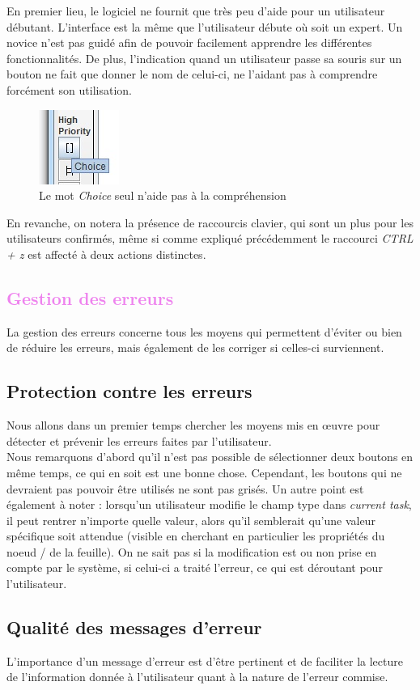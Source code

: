 \documentclass[12pt, a4paper]{article}
\begin{document}
En premier lieu, le logiciel ne fournit que très peu d'aide pour un utilisateur débutant. L'interface est la même que l'utilisateur débute où soit un expert. Un novice n'est pas guidé afin de pouvoir facilement apprendre les différentes fonctionnalités. De plus, l'indication quand un utilisateur passe sa souris sur un bouton ne fait que donner le nom de celui-ci, ne l'aidant pas à comprendre forcément son utilisation.
\begin{figure}[h]
\begin{center}
   \includegraphics[scale = 1]{imagebtn.jpg}
	\caption{Le mot \emph{Choice} seul n'aide pas à la compréhension}
	\end{center}
\end{figure}

En revanche, on notera la présence de raccourcis clavier, qui sont un plus pour les utilisateurs confirmés, même si comme expliqué précédemment le raccourci \emph{CTRL + z} est affecté à deux actions distinctes.

\textcolor{Violet}{\section{Gestion des erreurs}}
La gestion des erreurs concerne tous les moyens qui permettent d'éviter ou bien de réduire les erreurs, mais également de les corriger si celles-ci surviennent.

\textcolor{NavyBlue}{\subsection{Protection contre les erreurs}}
Nous allons dans un premier temps chercher les moyens mis en œuvre pour détecter et prévenir les erreurs faites par l'utilisateur. \\


Nous remarquons d'abord qu'il n'est pas possible de sélectionner deux boutons en même temps, ce qui en soit est une bonne chose. Cependant, les boutons qui ne devraient pas pouvoir être utilisés ne sont pas grisés. Un autre point est également à noter : lorsqu'un utilisateur modifie le champ type dans \emph{current task}, il peut rentrer n'importe quelle valeur, alors qu'il semblerait qu'une valeur spécifique soit attendue (visible en cherchant en particulier les propriétés du noeud / de la feuille). On ne sait pas si la modification est ou non prise en compte par le système, si celui-ci a traité l'erreur, ce qui est déroutant pour l'utilisateur.
\newpage
\textcolor{NavyBlue}{\subsection{Qualité des messages d'erreur}}
L'importance d'un message d'erreur est d'être pertinent et de faciliter la lecture de l'information donnée à l'utilisateur quant à la nature de l'erreur commise.\\
\end{document}
